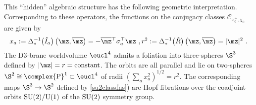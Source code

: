This ``hidden'' algebraic structure has the following geometric
interpretation. Corresponding to these operators, the functions on the
conjugacy classes $\mathcal{C}_{x_0^+,\chi_0}$ are given by
\begin{equation}
x_a:=\Delta_*^{-1}\bigl(\hat I_a\bigr)\left(\mz,
\overline{\mz} \right)=-\overline{\mz}{}^{ \top}
 \sigma_a^\top \mz \ ,    r^2:=
\Delta_*^{-1}\bigl(\hat R\bigr)\left(\mz,
\overline{\mz} \right)=|\mz|^2 \ .
\label{su2classfns}\end{equation}
The D3-brane worldvolume $\eucl^4$ admits a foliation into three-spheres
$\S^3$ defined by $|\mz|=r={\rm constant}$. The orbits are all
parallel and lie on two-spheres $\S^2\cong\complex{\rm
  P}^1\subset\eucl^4$ of radii $( \sum_ax_a^2)^{1/2}=r^2$. The corresponding
maps
$\S^3\to\S^2$ defined by \eqref{su2classfns}) are Hopf fibrations over
the coadjoint orbits ${\rm SU}(2) / {\rm U}(1)$ of the ${\rm SU}(2)$
symmetry group.

